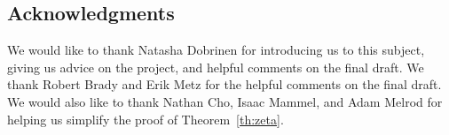 \documentclass[11pt]{article}
\newcommand{\om}{\omega}
\newcommand{\numpoints}{n}
\theoremstyle{plain}
\theoremstyle{definition}
\begin{document}





\subsection*{Acknowledgments}

We would like to thank Natasha Dobrinen for introducing us to this
subject, giving us advice on the project, and helpful comments on the 
final draft. We thank Robert Brady and Erik Metz for the helpful comments on the final draft.
We would also like to thank 
Nathan Cho, 
Isaac Mammel, and 
Adam Melrod for helping us simplify the proof of Theorem~\ref{th:zeta}.





\end{document}
